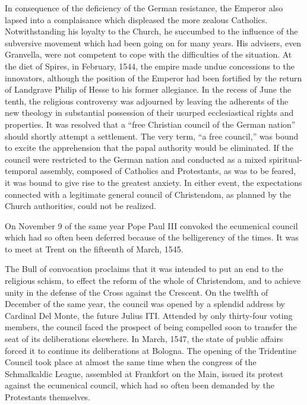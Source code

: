 In consequence of the deficiency of the German resistance, the Emperor
also lapsed into a complaisance which displeased the more zealous
Catholics. Notwithstanding his loyalty to the Church, he succumbed
to the influence of the subversive movement which had been going
on for many years. His advisers, even Granvella, were not competent
to cope with the difficulties of the situation. At the diet of Spires, in
February, 1544, the empire made undue concessions to the innovators,
although the position of the Emperor had been fortified by the return
of Landgrave Philip of Hesse to his former allegiance. In the
recess of June the tenth, the religious controversy was adjourned by
leaving the adherents of the new theology in substantial possession
of their usurped ecclesiastical rights and properties. It was resolved
that a “free Christian council of the German nation” should shortly
attempt a settlement. The very term, “a free council,” was bound to
excite the apprehension that the papal authority would be eliminated.
If the council were restricted to the German nation and conducted as
a mixed spiritual-temporal assembly, composed of Catholics and
Protestants, as was to be feared, it was bound to give rise to the greatest
anxiety. In either event, the expectations connected with a legitimate
general council of Christendom, as planned by the Church authorities,
could not be realized.

On November 9 of the same year Pope Paul III convoked the ecumenical council
which had so often been deferred because of the
belligerency of the times. It was to meet at Trent on the fifteenth of
March, 1545.

The Bull of convocation proclaims that it was intended to put
an end to the religious schism, to effect the reform of the whole of
Christendom, and to achieve unity in the defense of the Cross against
the Crescent. On the twelfth of December of the same year, the council
was opened by a splendid address by Cardinal Del Monte, the future
Julius ITI. Attended by only thirty-four voting members, the council
faced the prospect of being compelled soon to transfer the seat of its
deliberations elsewhere. In March, 1547, the state of public affairs
forced it to continue its deliberations at Bologna. The opening of the
Tridentine Council took place at almost the same time when the congress
of the Schmalkaldic League, assembled at Frankfort on the Main,
issued its protest against the ecumenical council, which had so often
been demanded by the Protestants themselves.

